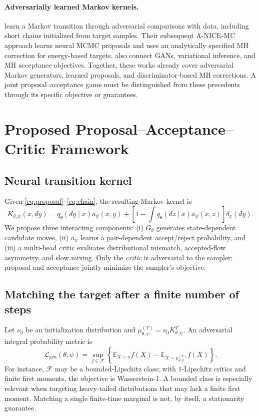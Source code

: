 \documentclass[11pt]{article}
\newcommand{\bbE}{\mathbb{E}}
\begin{document}
\paragraph{Adversarially learned Markov kernels.}
\cite{song2017generative} learn a Markov transition through adversarial comparisons with data, including short chains initialized from target samples. Their subsequent A-NICE-MC approach \cite{song2017nice} learns neural MCMC proposals and uses an analytically specified MH correction for energy-based targets. \cite{neklyudov2018metropolis} also connect GANs, variational inference, and MH acceptance objectives. Together, these works already cover adversarial Markov generators, learned proposals, and discriminator-based MH corrections. A joint proposal--acceptance game must be distinguished from these precedents through its specific objective or guarantees.

\section{Proposed Proposal--Acceptance--Critic Framework}
\subsection{Neural transition kernel}
Given \eqref{eq:proposal}--\eqref{eq:chain}, the resulting Markov kernel is
\begin{equation}
K_{\theta,\psi}(x,dy)=q_\theta(dy\mid x)a_\psi(x,y)
+\left[1-\int q_\theta(dz\mid x)a_\psi(x,z)\right]\delta_x(dy).
\label{eq:kernel}
\end{equation}
We propose three interacting components: (i) $G_\theta$ generates state-dependent candidate moves, (ii) $a_\psi$ learns a pair-dependent accept/reject probability, and (iii) a multi-head critic evaluates distributional mismatch, accepted-flow asymmetry, and slow mixing. Only the \emph{critic} is adversarial to the sampler; proposal and acceptance jointly minimize the sampler's objective.

\subsection{Matching the target after a finite number of steps}
Let $\nu_0$ be an initialization distribution and $\mu_{\theta,\psi}^{(T)}=\nu_0K_{\theta,\psi}^{T}$. An adversarial integral probability metric is
\begin{equation}
\mathcal L_{\mathrm{gen}}(\theta,\psi)=\sup_{f\in\mathcal F}
\left\{\bbE_{X\sim\pi}f(X)-\bbE_{X\sim\mu_{\theta,\psi}^{(T)}}f(X)\right\}.
\label{eq:gen}
\end{equation}
For instance, $\mathcal F$ may be a bounded-Lipschitz class; with $1$-Lipschitz critics and finite first moments, the objective is Wasserstein-1. A bounded class is especially relevant when targeting heavy-tailed distributions that may lack a finite first moment. Matching a single finite-time marginal is not, by itself, a stationarity guarantee.
\end{document}
